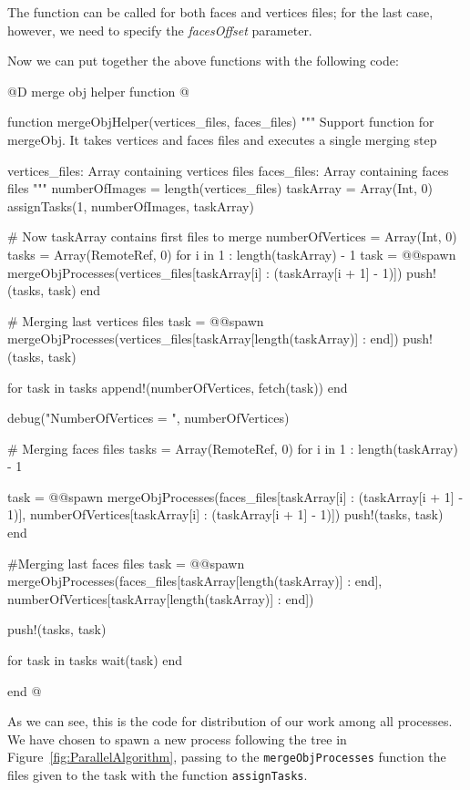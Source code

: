 \documentclass[11pt,oneside]{article}	%
\begin{document}
The function can be called for both faces and vertices files; for the last case, however, we need to specify the \textit{facesOffset} parameter.

Now we can put together the above functions with the following code:

@D merge obj helper function
@{function mergeObjHelper(vertices_files, faces_files)
  """
  Support function for mergeObj. It takes vertices and faces files
  and executes a single merging step

  vertices_files: Array containing vertices files
  faces_files: Array containing faces files
  """
  numberOfImages = length(vertices_files)
  taskArray = Array(Int, 0)
  assignTasks(1, numberOfImages, taskArray)

  # Now taskArray contains first files to merge
  numberOfVertices = Array(Int, 0)
  tasks = Array(RemoteRef, 0)
  for i in 1 : length(taskArray) - 1
    task = @@spawn mergeObjProcesses(vertices_files[taskArray[i] : (taskArray[i + 1] - 1)])
    push!(tasks, task)
  end

  # Merging last vertices files
  task = @@spawn mergeObjProcesses(vertices_files[taskArray[length(taskArray)] : end])
  push!(tasks, task)

  for task in tasks
    append!(numberOfVertices, fetch(task))
  end

  debug("NumberOfVertices = ", numberOfVertices)

  # Merging faces files
  tasks = Array(RemoteRef, 0)
  for i in 1 : length(taskArray) - 1

    task = @@spawn mergeObjProcesses(faces_files[taskArray[i] : (taskArray[i + 1] - 1)],
                                    numberOfVertices[taskArray[i] : (taskArray[i + 1] - 1)])
    push!(tasks, task)
  end

  #Merging last faces files
  task = @@spawn mergeObjProcesses(faces_files[taskArray[length(taskArray)] : end],
                                  numberOfVertices[taskArray[length(taskArray)] : end])

  push!(tasks, task)

  for task in tasks
    wait(task)
  end

end @}

As we can see, this is the code for distribution of our work among all processes. We have chosen to spawn a new process following the tree in Figure~\ref{fig:ParallelAlgorithm}, passing to the \texttt{mergeObjProcesses} function the files given to the task with the function \texttt{assignTasks}.
\end{document}
